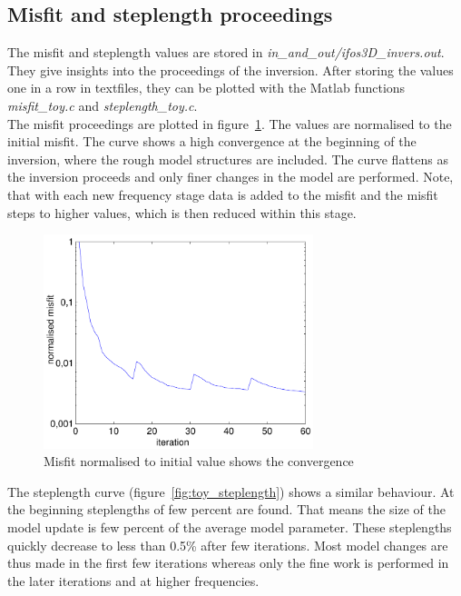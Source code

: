 \subsection{Misfit and steplength proceedings}
The misfit and steplength values are stored in \textit{in\_and\_out/ifos3D\_invers.out}. They give insights into the proceedings of the inversion. After storing the values one in a row in textfiles, they can be plotted with the Matlab functions \textit{misfit\_toy.c} and \textit{steplength\_toy.c}. \\
The misfit proceedings are plotted in figure~\ref{fig:toy_misfit}. The values are normalised to the initial misfit. The curve shows a high convergence at the beginning of the inversion, where the rough model structures are included. The curve flattens as the inversion proceeds and only finer changes in the model are performed. Note, that with each new frequency stage data is added to the misfit and the misfit steps to higher values, which is then reduced within this stage.\\
\begin{figure}[h!]
\begin{center} 
\includegraphics[width=0.7\textwidth]{fig_toy/toy_misfit}
\caption[Toy example - misfit]{Misfit normalised to initial value shows the convergence }\label{fig:toy_misfit}
\end{center}
\end{figure}
The steplength curve (figure~\ref{fig:toy_steplength}) shows a similar behaviour. At the beginning steplengths of few percent are found. That means the size of the model update is few percent of the average model parameter. These steplengths quickly decrease to less than 0.5\% after few iterations. Most model changes are thus made in the first few iterations whereas only the fine work is performed in the later iterations and at higher frequencies.
